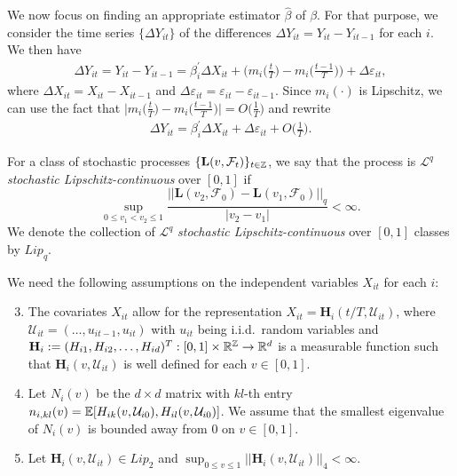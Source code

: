 We now focus on finding an appropriate estimator $\widehat{\beta}$ of $\beta$. For that purpose, we consider the time series $\{\Delta Y_{it}\}$ of the differences $\Delta Y_{it} = Y_{it} - Y_{i t-1}$ for each $i$. We then have
\begin{align*}
	\Delta Y_{it} = Y_{it} - Y_{i t-1} =\beta_i^\prime \Delta X_{it} + \bigg(m_i \Big( \frac{t}{T} \Big) - m_i \Big(\frac{t-1}{T}\Big)\bigg) + \Delta \varepsilon_{it},
\end{align*}
where $\Delta X_{it} = X_{it} - X_{it-1}$ and $ \Delta \varepsilon_{it} = \varepsilon_{it} - \varepsilon_{i t-1}$. Since $m_i(\cdot)$ is Lipschitz, we can use the fact that $ \big|m_i \big( \frac{t}{T} \big) - m_i \big(\frac{t-1}{T}\big) \big| = O\big(\frac{1}{T}\big)$ and rewrite 
\begin{align*}
	\Delta Y_{it} = \beta_i^\prime \Delta X_{it} + \Delta \varepsilon_{it} + O\Big(\frac{1}{T}\Big).
\end{align*}

For a class of stochastic processes $\{\mathbf{L}(v, \mathcal{F}_t)\}_{t\in\mathbb{Z}}$, we say that the process is $\mathcal{L}^q$ \textit{stochastic Lipschitz-continuous} over $[0,1]$ if
\[ \sup_{0\leq v_1 < v_2 \leq 1} \frac{||\mathbf{L}(v_2, \mathcal{F}_0) - \mathbf{L}(v_1, \mathcal{F}_0)||_q}{|v_2 - v_1|} < \infty.
\]
We denote the collection of $\mathcal{L}^q$ \textit{stochastic Lipschitz-continuous} over $[0,1]$ classes by $Lip_q$.

We need the following assumptions on the independent variables $X_{it}$ for each $i$:

\begin{enumerate}[label=(C\arabic*),leftmargin=1.05cm]
\setcounter{enumi}{2}

\item \label{C-reg1} The covariates $X_{it}$ allow for the representation $X_{it} = \mathbf{H}_i(t/T, \mathcal{U}_{it})$, where $\mathcal{U}_{it} =(\ldots,u_{it-1},u_{it})$ with $u_{it}$ being i.i.d.\ random variables and $\mathbf{H}_i := (H_{i1}, H_{i2}, \ldots, H_{id})^T: [0, 1] \times \mathbb{R}^{\mathbb{Z}} \rightarrow \mathbb{R}^d$ is a measurable function such that $\mathbf{H}_i(v, \mathcal{U}_{it})$ is well defined for each $v\in [0,1]$. 

\item \label{C-reg2} Let $N_i(v)$ be the $d\times d$ matrix with $kl$-th entry $n_{i, kl}(v) = \mathbb{E}[H_{ik}(v, \mathcal{U}_{i0}), H_{il}(v, \mathcal{U}_{i0})]$. We assume that the smallest eigenvalue of $N_i(v)$ is bounded away from $0$ on $v\in[0,1]$.

\item \label{C-reg3} Let $\mathbf{H}_{i}(v, \mathcal{U}_{it}) \in Lip_2$ and $\sup_{0\leq v\leq 1}||\mathbf{H}_{i}(v, \mathcal{U}_{it})||_4 <\infty$.
\end{enumerate}

